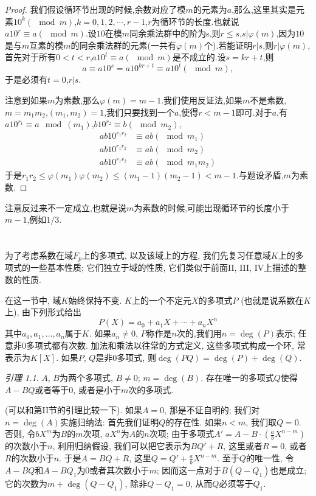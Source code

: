 \documentclass[12pt,a4paper]{book} %
\theoremstyle{remark}
\theoremstyle{example}
\theoremstyle{lemma}
\newtheorem{lemma}[theorem]{引理}
\theoremstyle{corollary}
\numberwithin{theorem}{chapter}
\begin{document}
\begin{enumerate}
\begin{proof}
我们假设循环节出现的时候,余数对应了模$m$的元素为$a$,那么,这里其实是元素$10^k(\mod{m})$,$k=0,1,2,\cdots,r-1$,$r$为循环节的长度.也就说$a10^r \equiv a (\mod{m})$.设$10$在模$m$同余乘法群中的阶为s,则$r \le s$,$s|\varphi(m)$,因为$10$是与$m$互素的模$m$的同余乘法群的元素(一共有$\varphi(m)$个).若能证明$r | s$,则$r | \varphi(m)$,首先对于所有$0 < t < r$,$a10^t\equiv a(\mod{m})$是不成立的.设$s = kr+t$,则
\[
a \equiv a10^s = a10^{kr+t} \equiv a10^{t}(\mod{m}),
\]
于是必须有$t=0$,$r|s$.

注意到如果$m$为素数,那么$\varphi(m)=m-1$.我们使用反证法,如果$m$不是素数,$m=m_1m_2$,$(m_1,m_2)=1$,我们只要找到一个$a$,使得$r < m-1$即可.对于$a$,有$a10^{r_1} \equiv a \mod(m_1)$,$b10^{r_2} \equiv b(\mod{m_2})$,
\[
\begin{aligned}
ab10^{r_1r_2} &\equiv ab (\mod{m_1}) \\
ab10^{r_1r_2} &\equiv ab (\mod{m_2}) \\
ab10^{r_1r_2} &\equiv ab (\mod{m_1m_2})
\end{aligned}
\]
于是$r_1r_2\le\varphi(m_1)\varphi(m_2)\le(m_1-1)(m_2-1)<m-1$.与题设矛盾,$m$为素数.
\end{proof}

注意反过来不一定成立,也就是说$m$为素数的时候,可能出现循环节的长度小于$m-1$,例如$1/3$.
\end{enumerate}

\chapter{} \label{chapter:9}
为了考虑系数在域$F_p$上的多项式, 以及该域上的方程, 我们先复习任意域$K$上的多项式的一些基本性质; 它们独立于域的性质, 它们类似于前面II, III, IV上描述的整数的性质.

在这一节中, 域$K$始终保持不变. $K$上的一个不定元$X$的多项式$P$ (也就是说系数在$K$上), 由下列形式给出
\[
P(X) = a_0 + a_1X + \cdots + a_nX^n
\]
其中$a_0, a_1, \ldots, a_n$属于$K$. 如果$a_n \neq 0$, $P$称作是$n$次的,我们用$n = \deg(P)$表示; 任意非0多项式都有次数. 加法和乘法以往常的方式定义, 这些多项式构成一个环, 常表示为$K[X]$. 如果$P$, $Q$是非0多项式, 则$\deg(PQ) = \deg(P) + \deg(Q)$.

\begin{lemma}
$A$, $B$为两个多项式, $B \neq 0$; $m = \deg(B)$. 存在唯一的多项式$Q$使得$A - BQ$或者等于0, 或者是小于$m$次的多项式.
\end{lemma}

(可以和第II节的引理比较一下). 如果$A = 0$, 那是不证自明的; 我们对$n = \deg(A)$实施归纳法: 首先我们证明$Q$的存在性. 如果$n < m$, 我们取$Q = 0$. 否则, 令$bX^m$为$B$的$m$次项, $aX^n$为$A$的$n$次项; 由于多项式$A' = A - B \cdot (\frac{a}{b} X^{n - m})$的次数小于$n$, 利用归纳假设, 我们可以把它表示为$BQ' + R$, 这里或者$R = 0$, 或者$R$的次数小于$n$. 于是$A = BQ + R$, 这里$Q = Q' + \frac{a}{b}X^{n - m}$. 至于$Q$的唯一性, 令$A - BQ$和$A - BQ_1$为0或者其次数小于$m$; 因而这一点对于$B(Q - Q_1)$也是成立; 它的次数为$m + \deg(Q - Q_1)$, 除非$Q - Q_1 = 0$, 从而$Q$必须等于$Q_1$.
\end{document}
